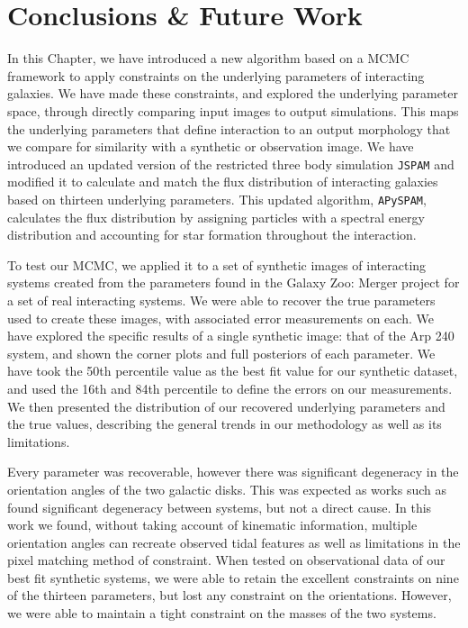 \section{Conclusions \& Future Work}\label{Conclusions}
\noindent In this Chapter, we have introduced a new algorithm based on a MCMC framework to apply constraints on the underlying parameters of interacting galaxies. We have made these constraints, and explored the underlying parameter space, through directly comparing input images to output simulations. This maps the underlying parameters that define interaction to an output morphology that we compare for similarity with a synthetic or observation image. We have introduced an updated version of the restricted three body simulation \texttt{JSPAM} and modified it to calculate and match the flux distribution of interacting galaxies based on thirteen underlying parameters. This updated algorithm, \texttt{APySPAM}, calculates the flux distribution by assigning particles with a spectral energy distribution and accounting for star formation throughout the interaction. 

To test our MCMC, we applied it to a set of synthetic images of interacting systems created from the parameters found in the Galaxy Zoo: Merger project for a set of real interacting systems. We were able to recover the true parameters used to create these images, with associated error measurements on each. We have explored the specific results of a single synthetic image: that of the Arp 240 system, and shown the corner plots and full posteriors of each parameter. We have took the 50th percentile value as the best fit value for our synthetic dataset, and used the 16th and 84th percentile to define the errors on our measurements. We then presented the distribution of our recovered underlying parameters and the true values, describing the general trends in our methodology as well as its limitations. 

Every parameter was recoverable, however there was significant degeneracy in the orientation angles of the two galactic disks. This was expected as works such as \citet{2010ASPC..423..227S} found significant degeneracy between systems, but not a direct cause. In this work we found, without taking account of kinematic information, multiple orientation angles can recreate observed tidal features as well as limitations in the pixel matching method of constraint. When tested on observational data of our best fit synthetic systems, we were able to retain the excellent constraints on nine of the thirteen parameters, but lost any constraint on the orientations. However, we were able to maintain a tight constraint on the masses of the two systems. 

